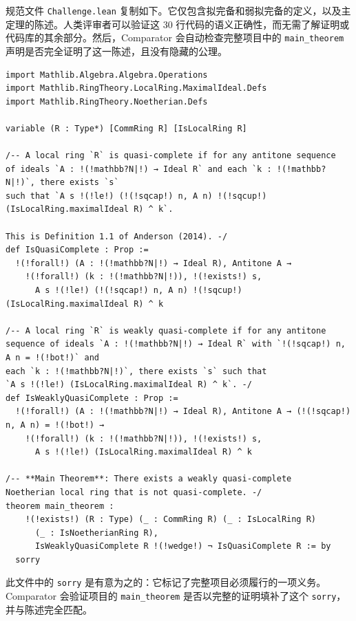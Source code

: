 ﻿\documentclass[]{pkuai4m}
\theoremstyle{plain}
\theoremstyle{definition}
\begin{document}
规范文件 \texttt{Challenge.lean} 复制如下。它仅包含拟完备和弱拟完备的定义，以及主定理的陈述。人类评审者可以验证这 30 行代码的语义正确性，而无需了解证明或代码库的其余部分。然后，Comparator 会自动检查完整项目中的 \texttt{main\_theorem} 声明是否完全证明了这一陈述，且没有隐藏的公理。

\begin{Verbatim}[fontsize=\small,commandchars=!?\|]
import Mathlib.Algebra.Algebra.Operations
import Mathlib.RingTheory.LocalRing.MaximalIdeal.Defs
import Mathlib.RingTheory.Noetherian.Defs

variable (R : Type*) [CommRing R] [IsLocalRing R]

/-- A local ring `R` is quasi-complete if for any antitone sequence
of ideals `A : !(!mathbb?N|!) → Ideal R` and each `k : !(!mathbb?N|!)`, there exists `s`
such that `A s !(!le!) (!(!sqcap!) n, A n) !(!sqcup!) (IsLocalRing.maximalIdeal R) ^ k`.

This is Definition 1.1 of Anderson (2014). -/
def IsQuasiComplete : Prop :=
  !(!forall!) (A : !(!mathbb?N|!) → Ideal R), Antitone A →
    !(!forall!) (k : !(!mathbb?N|!)), !(!exists!) s,
      A s !(!le!) (!(!sqcap!) n, A n) !(!sqcup!) (IsLocalRing.maximalIdeal R) ^ k

/-- A local ring `R` is weakly quasi-complete if for any antitone
sequence of ideals `A : !(!mathbb?N|!) → Ideal R` with `!(!sqcap!) n, A n = !(!bot!)` and
each `k : !(!mathbb?N|!)`, there exists `s` such that
`A s !(!le!) (IsLocalRing.maximalIdeal R) ^ k`. -/
def IsWeaklyQuasiComplete : Prop :=
  !(!forall!) (A : !(!mathbb?N|!) → Ideal R), Antitone A → (!(!sqcap!) n, A n) = !(!bot!) →
    !(!forall!) (k : !(!mathbb?N|!)), !(!exists!) s,
      A s !(!le!) (IsLocalRing.maximalIdeal R) ^ k

/-- **Main Theorem**: There exists a weakly quasi-complete
Noetherian local ring that is not quasi-complete. -/
theorem main_theorem :
    !(!exists!) (R : Type) (_ : CommRing R) (_ : IsLocalRing R)
      (_ : IsNoetherianRing R),
      IsWeaklyQuasiComplete R !(!wedge!) ¬ IsQuasiComplete R := by
  sorry
\end{Verbatim}
\noindent 此文件中的 \texttt{sorry} 是有意为之的：它标记了完整项目必须履行的一项义务。Comparator 会验证项目的 \texttt{main\_theorem} 是否以完整的证明填补了这个 \texttt{sorry}，并与陈述完全匹配。
\let\clearpage\relax
\end{document}
